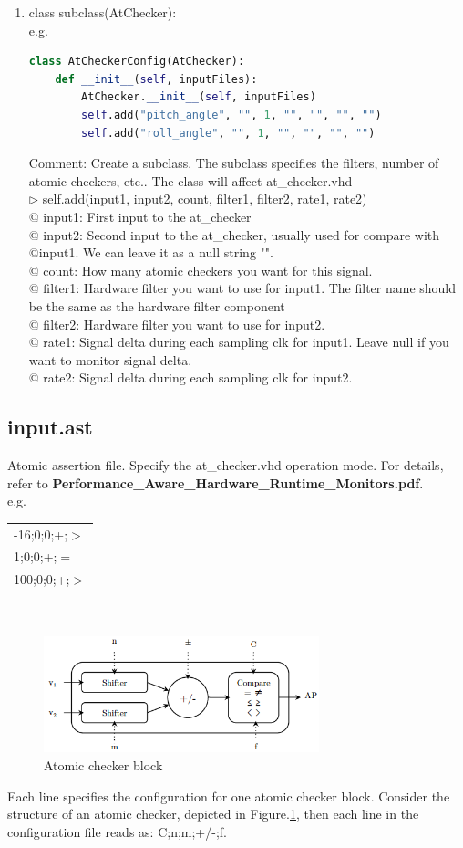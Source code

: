 \begin{enumerate}
\item class subclass(AtChecker):\\
e.g.
\begin{lstlisting}[language=Python]
class AtCheckerConfig(AtChecker):
	def __init__(self, inputFiles):
		AtChecker.__init__(self, inputFiles)
		self.add("pitch_angle", "", 1, "", "", "", "")
		self.add("roll_angle", "", 1, "", "", "", "")
\end{lstlisting}
Comment: Create a subclass. The subclass specifies the filters, number of atomic checkers, etc.. The class will affect at\_checker.vhd\\
$\triangleright$ self.add(input1, input2, count, filter1, filter2, rate1, rate2)\\
@ input1: First input to the at\_checker\\
@ input2: Second input to the at\_checker, usually used for compare with @input1. We can leave it as a null string "".\\
@ count: How many atomic checkers you want for this signal.\\
@ filter1: Hardware filter you want to use for input1. The filter name should be the same as the hardware filter component\\
@ filter2: Hardware filter you want to use for input2.\\
@ rate1: Signal delta during each sampling clk for input1. Leave null if you want to monitor signal delta.\\
@ rate2: Signal delta during each sampling clk for input2.

\end{enumerate}


\subsection{input.ast}\label{input.ast}
Atomic assertion file. Specify the at\_checker.vhd operation mode. For details, refer to \textbf{Performance\_Aware\_Hardware\_Runtime\_Monitors.pdf}.
\\
e.g.\\
\begin{tabular}{|p{}|}
\hline
-16;0;0;+;$>$\\
1;0;0;+;$=$\\
100;0;0;+;$>$\\
\hline
\end{tabular}
\\
\begin{figure}[h]
\caption{Atomic checker block}
\label{ac}
\includegraphics[width=8cm]{./fig/ast.png}
\centering
\end{figure}
Each line specifies the configuration for one atomic checker block. Consider the structure
of an atomic checker, depicted in Figure.\ref{ac}, then each line in the configuration file reads as:
C;n;m;+/-;f.

